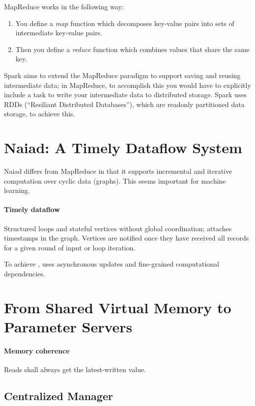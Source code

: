 \documentclass{article}
\begin{document}
MapReduce works in the following way:
\begin{enumerate}
\item You define a \emph{map} function which decomposes key-value
  pairs into sets of intermediate key-value pairs.
\item Then you define a \emph{reduce} function which combines values
  that share the same key.
\end{enumerate}

Spark aims to extend the MapReduce paradigm to support saving and
reusing intermediate data; in MapReduce, to accomplish this you would
have to explicitly include a task to write your intermediate data to
distributed storage. Spark uses RDDs (``Resiliant Distributed
Databases''), which are readonly partitioned data storage, to achieve
this.


\section{Naiad: A Timely Dataflow System}

Naiad differs from MapReduce in that it supports incremental and
iterative computation over cyclic data (graphs). This seems important
for machine learning.

\paragraph{Timely dataflow} Structured loops and stateful vertices
without global coordination; attaches timestamps in the
graph. Vertices are notified once they have received all records for a
given round of input or loop iteration.

To achieve , uses asynchronous updates and
fine-grained computational dependencies.


\section{From Shared Virtual Memory to Parameter Servers}

\paragraph{Memory coherence} Reads shall always get the latest-written
value.

\subsection{Centralized Manager}
\end{document}
